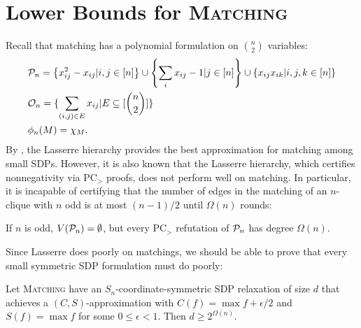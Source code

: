 \section{Lower Bounds for \textsc{Matching}}
Recall that matching has a polynomial formulation on $\binom{n}{2}$ variables:
\begin{align*}
&\mathcal P_n = \left\{x_{ij}^2 - x_{ij} | i,j \in [n]\right\} \cup \left\{\sum_i x_{ij} - 1 | j \in [n]\right\} \cup \left\{x_{ij}x_{ik} | i,j,k \in [n]\right\} \\
&\mathcal O_n = \{\sum_{(i,j) \in E} x_{ij} | E \subseteq [\binom{n}{2}]\} \\
&\phi_n(M) = \chi_M.
\end{align*}
By , the Lasserre hierarchy provides the best approximation for matching among small SDPs. However, it is also known that the Lasserre hierarchy, which certifies nonnegativity via PC$_>$ proofs, does not perform well on matching. In particular, it is incapable of certifying that the number of edges in the matching of an $n$-clique with $n$ odd is at most $(n-1)/2$ until $\Omega(n)$ rounds:
\begin{theorem}\label{thm:grigoriev}
If $n$ is odd, $V(\mathcal P_n) = \emptyset$, but every PC$_>$ refutation of $\mathcal P_n$ has degree $\Omega(n)$.
\end{theorem}
Since Lasserre does poorly on matchings, we should be able to prove that every small symmetric SDP formulation must do poorly: 
\begin{theorem}
Let \textsc{Matching} have an $S_n$-coordinate-symmetric SDP relaxation of size $d$ that achieves a $(C,S)$-approximation with $C(f) = \max f + \epsilon/2$ and $S(f) = \max f$ for some $0 \leq \epsilon < 1$. Then $d \geq 2^{\Omega(n)}$.
\end{theorem}
